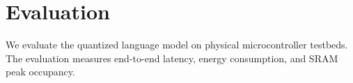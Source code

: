 \documentclass{article}
\begin{document}
\section{Evaluation}
\label{sec:evaluation}
We evaluate the quantized language model on physical microcontroller testbeds.
The evaluation measures end-to-end latency, energy consumption, and SRAM peak occupancy.
\end{document}
